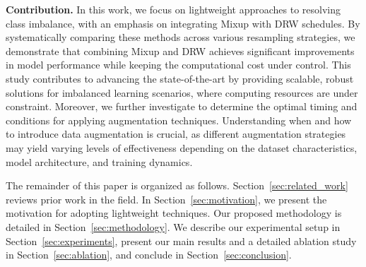 \textbf{Contribution.} 
In this work, we focus on lightweight approaches to resolving class imbalance, with an emphasis on integrating Mixup with DRW schedules. By systematically comparing these methods across various resampling strategies, we demonstrate that combining Mixup and DRW achieves significant improvements in model performance while keeping the computational cost under control. This study contributes to advancing the state-of-the-art by providing scalable, robust solutions for imbalanced learning scenarios, where computing resources are under constraint. Moreover, we further investigate to determine the optimal timing and conditions for applying augmentation techniques. Understanding when and how to introduce data augmentation is crucial, as different augmentation strategies may yield varying levels of effectiveness depending on the dataset characteristics, model architecture, and training dynamics.

The remainder of this paper is organized as follows. Section~\ref{sec:related_work} reviews prior work in the field. In Section~\ref{sec:motivation}, we present the motivation for adopting lightweight techniques. Our proposed methodology is detailed in Section~\ref{sec:methodology}. We describe our experimental setup in Section~\ref{sec:experiments}, present our main results and a detailed ablation study in Section~\ref{sec:ablation}, and conclude in Section~\ref{sec:conclusion}.